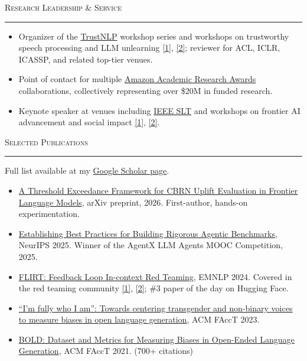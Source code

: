 \documentclass[11pt]{article}
\newcommand{\sectionheading}[1]{%
  \vspace{8pt}%
  {\large\scshape #1}\par\vspace{1pt}\hrule\vspace{3pt}%
}
\begin{document}
\newpage

\sectionheading{Research Leadership \& Service}
\begin{itemize}
  \item Organizer of the \href{https://trustnlpworkshop.github.io/}{TrustNLP} workshop series and workshops on trustworthy speech processing and LLM unlearning \href{https://trustworthyspeechprocessing.github.io/}{[1]}, \href{https://llmunlearningsemeval2025.github.io/}{[2]}; reviewer for ACL, ICLR, ICASSP, and related top-tier venues.
  \item Point of contact for multiple \href{https://www.amazon.science/research-awards}{Amazon Academic Research Awards} collaborations, collectively representing over \$20M in funded research.
  \item Keynote speaker at venues including \href{https://signalprocessingsociety.org/newsletter/2026/06/bridging-research-and-innovation-ieee-spoken-language-technology-slt-workshop}{IEEE SLT} and workshops on frontier AI advancement and social impact \href{https://advml-frontier.github.io/}{[1]}, \href{https://nlp4social.github.io/NSG-2026/}{[2]}.
\end{itemize}

\sectionheading{Selected Publications}
Full list available at my \href{https://scholar.google.com/citations?user=gSTLsFcAAAAJ}{Google Scholar page}.

\begin{itemize}
  \item \href{https://arxiv.org/abs/2607.12200}{A Threshold Exceedance Framework for CBRN Uplift Evaluation in Frontier Language Models}, arXiv preprint, 2026. {\color{gray}First-author, hands-on experimentation.}
  \item \href{https://arxiv.org/abs/2507.02825}{Establishing Best Practices for Building Rigorous Agentic Benchmarks}, NeurIPS 2025. {\color{gray}Winner of the AgentX LLM Agents MOOC Competition, 2025.}
  \item \href{https://arxiv.org/abs/2308.04265}{FLIRT: Feedback Loop In-context Red Teaming}, EMNLP 2024. {\color{gray}Covered in the red teaming community \href{https://lilianweng.github.io/posts/2023-10-25-adv-attack-llm/}{[1]}, \href{https://huggingface.co/papers/2308.04265}{[2]}; \#3 paper of the day on Hugging Face.}
  \item \href{https://arxiv.org/abs/2305.09941}{``I'm fully who I am'': Towards centering transgender and non-binary voices to measure biases in open language generation}, ACM FAccT 2023.
  \item \href{https://arxiv.org/abs/2101.11718}{BOLD: Dataset and Metrics for Measuring Biases in Open-Ended Language Generation}, ACM FAccT 2021. {\color{gray}(700+ citations)}
\end{itemize}
\end{document}
